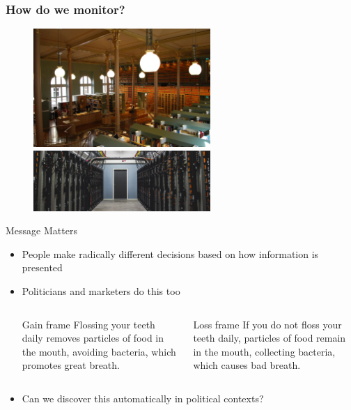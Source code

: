 \documentclass[compress]{beamer}
\begin{document}



\begin{frame}
\frametitle{How do we monitor?}

\begin{figure}
    \centering
    \includegraphics[width=0.6\textwidth]{magnusson/Riksdagsbiblioteket_2.JPG}

    \includegraphics[width=0.6\textwidth]{magnusson/triolith1_1200x410.jpg}
\end{figure}


\end{frame}


\begin{frame}{Message Matters}

\begin{itemize}
  \item People make radically different decisions based on how information is
  presented~\cite{tversky-92}
  \item Politicians and marketers do this too
\begin{columns}
\begin{block}{Gain frame}
    Flossing your teeth daily removes particles of food in the mouth, avoiding bacteria, which promotes great breath.
\end{block}
\begin{block}{Loss frame}
    If you do not floss your teeth daily, particles of food remain in the mouth, collecting bacteria, which causes bad breath.
\end{block}

\end{columns}
\pause
  \item Can we discover this automatically in political contexts?
\end{itemize}

\end{frame}
\end{document}
